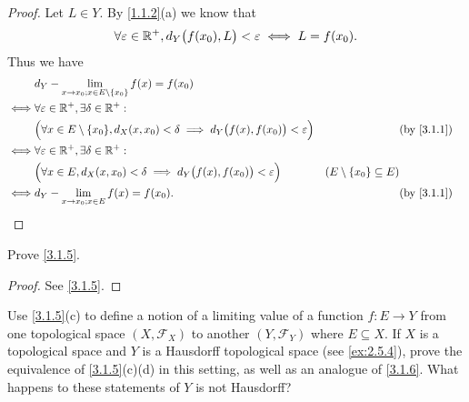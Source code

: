 \begin{proof}
  Let \(L \in Y\).
  By \cref{1.1.2}(a) we know that
  \[
    \forall \varepsilon \in \mathbb{R}^+, d_Y\big(f(x_0), L\big) < \varepsilon \iff L = f(x_0).
  \]
  Thus we have
  \begin{align*}
         & d_Y - \lim_{x \to x_0 ; x \in E \setminus \set{x_0}} f(x) = f(x_0)                                                                                                      \\
    \iff & \forall \varepsilon \in \R^+, \exists \delta \in \R^+ :                                                                                                                 \\
         & \Big(\forall x \in E \setminus \set{x_0}, d_X(x, x_0) < \delta \implies d_Y\big(f(x), f(x_0)\big) < \varepsilon\Big) &                                     & \by{3.1.1} \\
    \iff & \forall \varepsilon \in \R^+, \exists \delta \in \R^+ :                                                                                                                 \\
         & \Big(\forall x \in E, d_X(x, x_0) < \delta \implies d_Y\big(f(x), f(x_0)\big) < \varepsilon\Big)                     & (E \setminus \set{x_0} \subseteq E)              \\
    \iff & d_Y - \lim_{x \to x_0 ; x \in E} f(x) = f(x_0).                                                                      &                                     & \by{3.1.1}
  \end{align*}
\end{proof}

\begin{ex}\label{ex:3.1.2}
  Prove \cref{3.1.5}.
\end{ex}

\begin{proof}
  See \cref{3.1.5}.
\end{proof}

\begin{ex}\label{ex:3.1.3}
  Use \cref{3.1.5}(c) to define a notion of a limiting value of a function \(f : E \to Y\) from one topological space \((X, \mathcal{F}_X)\) to another \((Y, \mathcal{F}_Y)\) where \(E \subseteq X\).
  If \(X\) is a topological space and \(Y\) is a Hausdorff topological space (see \cref{ex:2.5.4}), prove the equivalence of \cref{3.1.5}(c)(d) in this setting, as well as an analogue of \cref{3.1.6}.
  What happens to these statements of \(Y\) is not Hausdorff?
\end{ex}

